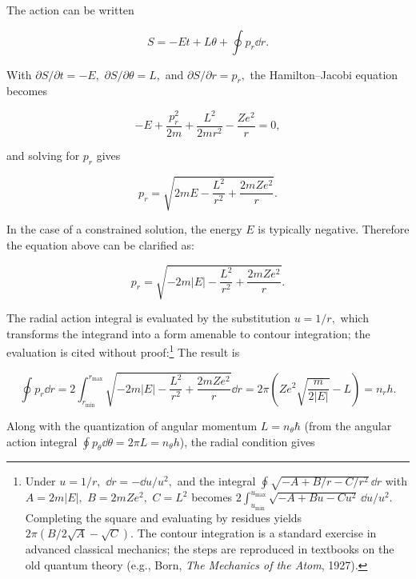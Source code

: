 The action can be written
\begin{linenomath}
    \begin{equation}
        S=-Et+L\theta+\oint p_r\dd r.
    \end{equation}
\end{linenomath}
With $\partial S/\partial t=-E,$ $\partial S/\partial\theta=L,$ and $\partial S/\partial r=p_r,$ the Hamilton--Jacobi equation becomes
\begin{linenomath}
    \begin{equation}
        -E+\frac{p_r^{2}}{2m}+\frac{L^{2}}{2mr^{2}}-\frac{Ze^{2}}{r}=0,
    \end{equation}
\end{linenomath}
and solving for $p_r$ gives
\begin{linenomath}\begin{equation}
p_r = \sqrt{2mE-\frac{L^2}{r^2}+\frac{2mZe^2}{r}}.
\end{equation}\end{linenomath}
In the case of a constrained solution, the energy $E$ is typically negative. Therefore the equation above can be clarified as:
\begin{linenomath}\begin{equation}
p_r = \sqrt{-2m|E|-\frac{L^2}{r^2}+\frac{2mZe^2}{r}}.
\end{equation}\end{linenomath}
The radial action integral is evaluated by the substitution $u=1/r,$ which transforms the integrand into a form amenable to contour integration; the evaluation is cited without proof:\footnote{Under $u=1/r,$ $\dd r=-\dd u/u^{2},$ and the integral $\oint\sqrt{-A+B/r-C/r^{2}}\,\dd r$ with $A=2m|E|,$ $B=2mZe^{2},$ $C=L^{2}$ becomes $2\int_{u_{\min}}^{u_{\max}}\sqrt{-A+Bu-Cu^{2}}\,\dd u/u^{2}.$ Completing the square and evaluating by residues yields $2\pi(B/2\sqrt{A}-\sqrt{C}).$ The contour integration is a standard exercise in advanced classical mechanics; the steps are reproduced in textbooks on the old quantum theory (e.g., Born, \emph{The Mechanics of the Atom}, 1927).} The result is
\begin{linenomath}
    \begin{equation}
        \oint p_r\dd r = 2\int_{r_{\min{}}}^{r_{\max{}}} \sqrt{-2m|E|-\frac{L^2}{r^2}+\frac{2mZe^2}{r}} \dd r=2\pi\left( Ze^2\sqrt{\frac{m}{2|E|}}-L \right)=n_rh.
    \end{equation}
\end{linenomath}
Along with the quantization of angular momentum $L=n_\theta\hbar$ (from the angular action integral $\oint p_\theta\dd\theta=2\pi L=n_\theta h$), the radial condition gives
